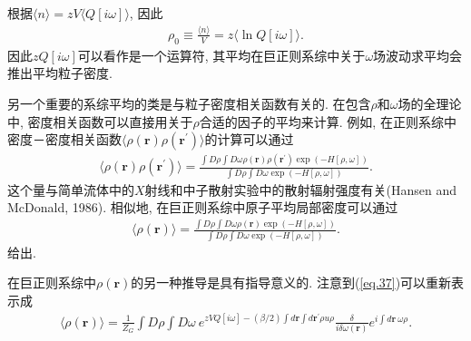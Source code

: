 根据$\langle n \rangle=zV\langle Q[i\omega] \rangle$, 因此
\label{subsec.equations}
   \begin{equation}
       \begin{aligned}
           \rho_0 \equiv \frac{\langle n \rangle}{V}=z\langle \ln Q[i\omega] \rangle.
       \end{aligned}
       \label{eq.35}      
    \end{equation}
因此$zQ[i\omega]$可以看作是一个运算符,
其平均在巨正则系综中关于$\omega$场波动求平均会推出平均粒子密度.
\par
另一个重要的系综平均的类是与粒子密度相关函数有关的.
在包含$\rho$和$\omega$场的全理论中,
密度相关函数可以直接用关于$\rho$合适的因子的平均来计算. 例如,
在正则系综中密度－密度相关函数$\langle
\rho(\bm{r})\rho(\bm{r^{'}})\rangle$的计算可以通过
\label{subsec.equations}
   \begin{equation}
       \begin{aligned}
           \langle \rho(\bm{r})\rho(\bm{r^{'}})\rangle=\frac{\int D\rho \int
           D\omega \rho(\bm{r})\rho(\bm{r^{'}})\exp(-H[\rho, \omega])}{\int D\rho \int D\omega
           \exp(-H[\rho, \omega])}.
       \end{aligned}
       \label{eq.36}      
    \end{equation}
这个量与简单流体中的$X$射线和中子散射实验中的散射辐射强度有关(Hansen and
McDonald, 1986). 相似地, 在巨正则系综中原子平均局部密度可以通过
\label{subsec.equations}
   \begin{equation}
       \begin{aligned}
           \langle \rho(\bm{r})\rangle=\frac{\int D\rho \int
           D\omega \rho(\bm{r})\exp(-H[\rho, \omega])}{\int D\rho \int D\omega
           \exp(-H[\rho, \omega])}.
       \end{aligned}
       \label{eq.37}      
    \end{equation}
给出.
\par
在巨正则系综中$\rho(\bm{r})$的另一种推导是具有指导意义的.
注意到(\ref{eq.37})可以重新表示成
\label{subsec.equations}
   \begin{equation}
       \begin{aligned}
          \langle \rho(\bm{r}) \rangle=\frac{1}{Z_G} \int D\rho \int D\omega\
           e^{zVQ[i\omega]-(\beta/2)\int d\bm{r}\int d\bm{r^{'}}\rho u\rho}
           \frac{\delta}{i\delta\omega(\bm{r})} e^{i\int d\bm{r}\ \omega\rho}.
       \end{aligned}
       \label{eq.38}      
    \end{equation}
